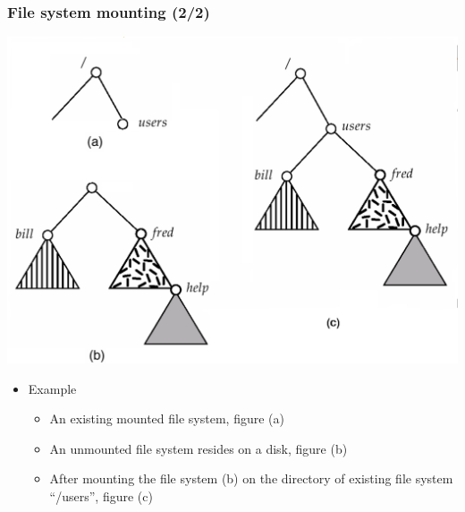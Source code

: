 \documentclass[CJKutf8,xcolor=pdftex,dvipsnames,table]{beamer}
\begin{document}
\begin{CJK*}{UTF8}{song}
  \begin{frame}
    \frametitle{File system mounting (2/2)} \pause
    \begin{center}
      \includegraphics[scale=.15]{v6f11-11x} \pause
    \end{center}
    \begin{itemize}\parskip=0pt
    \item Example \pause
      \begin{itemize}\parskip=0pt
      \item An existing mounted file system, figure (a) \pause
      \item An unmounted file system resides on a disk, figure (b) \pause
      \item After mounting the file system (b) on the directory of existing file system ``/users'', figure (c)
      \end{itemize}
    \end{itemize}
  \end{frame}


\end{CJK*}
\end{document}
